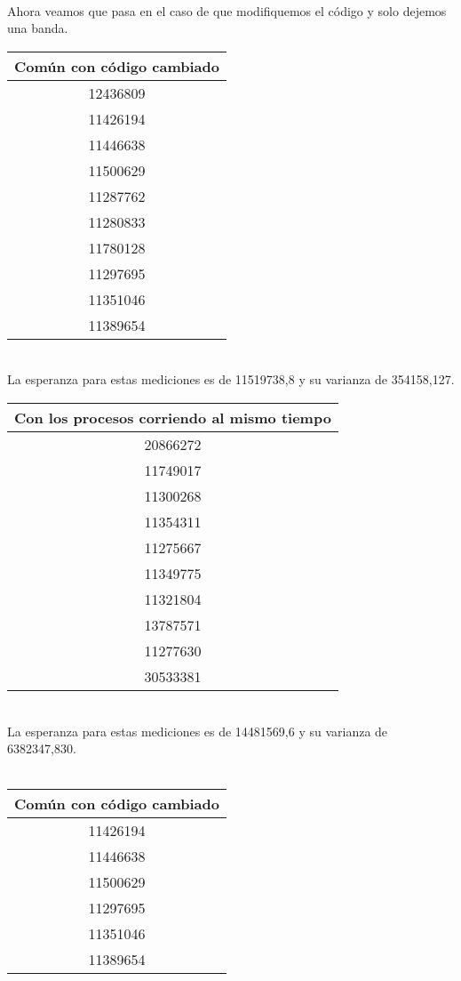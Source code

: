 ﻿\documentclass[a4paper]{article}
\begin{document}
\ \\
Ahora veamos que pasa en el caso de que modifiquemos el c\'odigo y solo dejemos una banda.
\ \\
\begin{center}
  \begin{tabular}{| c |}
    \hline
    Com\'un con c\'odigo cambiado\\ 
    \hline\hline
    12436809\\
    \hline
    11426194\\
    \hline
    11446638\\
    \hline
    11500629\\
    \hline
    11287762\\
    \hline
    11280833\\
    \hline
    11780128\\
    \hline
    11297695\\
    \hline
    11351046\\
    \hline
    11389654\\
    \hline
  \end{tabular}
\end{center}
\ \\
La esperanza para estas mediciones es de 11519738,8 y su varianza de 354158,127.
\begin{center}
  \begin{tabular}{| c |}
    \hline
    Con los procesos corriendo al mismo tiempo\\ 
    \hline\hline
    20866272\\
    \hline
    11749017\\
    \hline
    11300268\\
    \hline
    11354311\\
    \hline
    11275667\\
    \hline
    11349775\\
    \hline
    11321804\\
    \hline
    13787571\\
    \hline
    11277630\\
    \hline
    30533381\\
    \hline
  \end{tabular}
\end{center}
\ \\
La esperanza para estas mediciones es de 14481569,6 y su varianza de 6382347,830.
\ \\
\ \\
\begin{center}
  \begin{tabular}{| c |}
    \hline
    Com\'un con c\'odigo cambiado\\ 
    \hline\hline
    11426194\\
    \hline
    11446638\\
    \hline
    11500629\\
    \hline
    11297695\\
    \hline
    11351046\\
    \hline
    11389654\\
    \hline
  \end{tabular}
\end{center}
\end{document}
